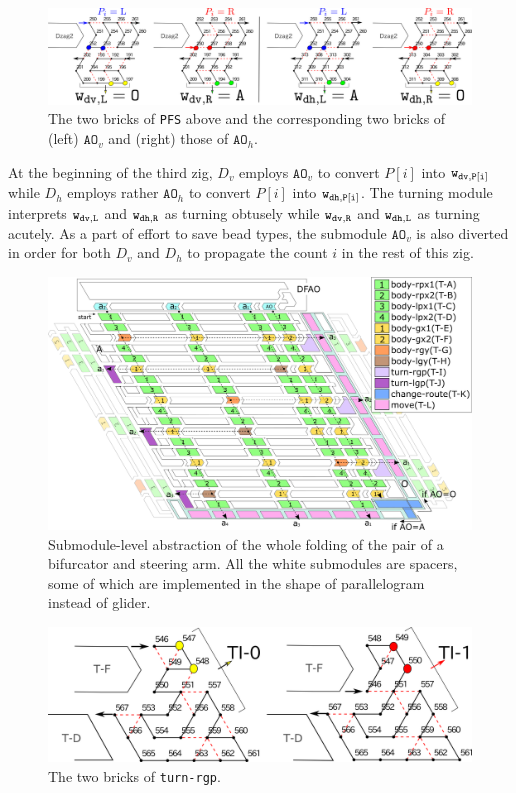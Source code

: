 \documentclass[runningheads]{llncs}
\begin{document}
\begin{figure}[tb]
\centering
\includegraphics[width=\linewidth]{Figs/PFS.png}
\caption{The two bricks of \texttt{PFS} above and the corresponding two bricks of (left) $\mathtt{AO}_v$ and (right) those of $\mathtt{AO}_h$.}
\label{fig:PFS}
\end{figure}


At the beginning of the third zig, $D_v$ employs $\mathtt{AO}_v$ to convert $P[i]$ into ${\tt w_{dv, P[i]}}$ while $D_h$ employs rather $\mathtt{AO}_h$ to convert $P[i]$ into ${\tt w_{dh, P[i]}}$. 
The turning module interprets ${\tt w_{dv, L}}$ and ${\tt w_{dh, R}}$ as turning obtusely while ${\tt w_{dv, R}}$ and ${\tt w_{dh, L}}$ as turning acutely. 
As a part of effort to save bead types, the submodule $\mathtt{AO}_v$ is also diverted in order for both $D_v$ and $D_h$ to propagate the count $i$ in the rest of this zig. 

\begin{figure}[tb]
\centering
\includegraphics[width=\linewidth]{Figs/overall_turn_part.png}
\caption{Submodule-level abstraction of the whole folding of the pair of a bifurcator and steering arm. 
All the white submodules are spacers, some of which are implemented in the shape of parallelogram instead of glider.}
\label{fig:turner}
\end{figure}

\begin{figure}
\vspace*{-7mm}
\centering
\includegraphics[width=\linewidth]{Figs/turn-rgp.png}
\caption{The two bricks of \texttt{turn-rgp}.}
\label{fig:turn-rgp}
\end{figure}
\end{document}
